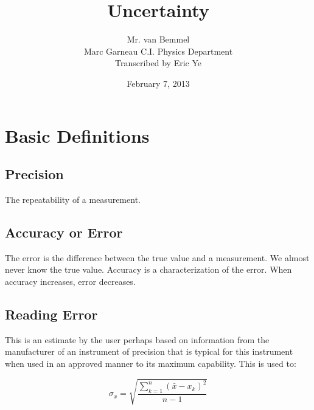 \documentclass[twoside, 12pt]{article}
\begin{document}
\title{Uncertainty}
\author{Mr. van Bemmel\\
Marc Garneau C.I. Physics Department\\
Transcribed by Eric Ye}
\renewcommand{\today}{February 7, 2013}
\date{\today}
\maketitle

\section{Basic Definitions}
    \subsection{Precision}
    The repeatability of a measurement.
    \subsection{Accuracy or Error}
    The error is the difference between the true value and a measurement.
    We almost never know the true value. Accuracy is a characterization of the error. When accuracy increases, error decreases.
    
    \subsection{Reading Error}
    This is an estimate by the user perhaps based on information from the manufacturer of an instrument of precision that is typical for this instrument when used in an approved manner to its maximum capability.
    This is used to:
        
    \begin{equation}
    \sigma_x = \sqrt{\frac{\sum_{k=1}^n{(\bar{x} - x_k)^2}}{n-1}}
    \end{equation}
\end{document}
